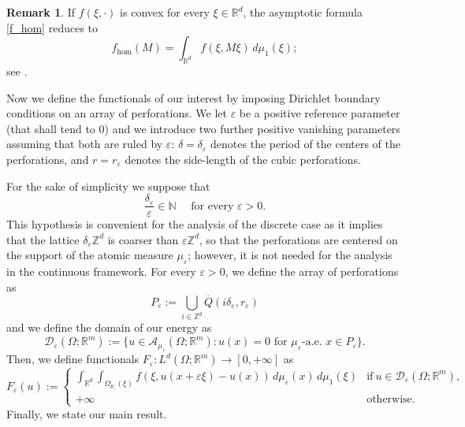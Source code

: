 \documentclass{article}
\theoremstyle{plain}
\theoremstyle{definition}
\newtheorem{remark}[theorem]{Remark}
\def\e{\varepsilon}
\def\rr{{\mathbb R}}
\def\ZZ{{\mathbb Z}}
\newcommand{\A}{\mathcal{A}}
\numberwithin{equation}{section}
\begin{document}
\begin{remark}
If $f(\xi,\cdot)$ is convex for every $\xi \in \mathbb{R}^{d}$, the asymptotic formula \eqref{f_hom} reduces to
 \begin{equation*}
     f_{\hom}(M)=\int_{\mathbb{R}^d}f(\xi,M\xi)\, d\mu_1(\xi);
 \end{equation*}
see \cite[Theorem 6.2]{AABPT}.
\end{remark}

Now we define the functionals of our interest by imposing Dirichlet boundary conditions on an array of perforations. We let $\e$ be a positive reference parameter (that shall tend to $0$) and we introduce two further positive vanishing parameters assuming that both are ruled by $\e$: $\delta=\delta_\e$ denotes the period of the centers of the perforations, and $r=r_\e$ denotes the side-length of the cubic perforations.

For the sake of simplicity we suppose that
\begin{equation*}
\frac{\delta_{\varepsilon}}{\e}\in \mathbb{N}\quad \text{ for every } \e>0.
\end{equation*}
This hypothesis is convenient for the analysis of the discrete case as it implies that the lattice $\delta_\e\ZZ^d$ is coarser than $\e \ZZ^d$, so that the perforations are centered on the support of the atomic measure $\mu_\e$; however, it is not needed for the analysis in the continuous framework. For every $\e>0$, we define the array of perforations as 
\begin{equation*}
    P_{\e}:=\bigcup_{i\in \mathbb{Z}^{d}}\overline{Q}(i\delta_\e,r_{\e})\end{equation*}
and we define the domain of our energy as 
\begin{equation*}
     \mathcal{D}_\e(\Omega;\rr^m):=\{u\in \A_{\mu_\e}(\Omega;\rr^m) : u(x)=0\text{ for } \mu_\e\text{-a.e. } x\in P_\e\}.
\end{equation*}
Then, we define functionals $F_{\varepsilon}:L^d(\Omega;\mathbb{R}^m)\to[0,+\infty]$ as 
\begin{equation}
\label{funzionali}
    F_{\e}(u):=
    \begin{cases}
\displaystyle\int_{\mathbb{R}^{d}}\int_{\Omega_{\mu_\e}(\xi)}f(\xi, u(x+\e\xi)-u(x))\, d\mu_\e(x)\, d\mu_1(\xi) &\text{if}\  u \in  \mathcal{D}_\e(\Omega;\rr^m), \\
        +\infty &\text{otherwise}.
    \end{cases}
\end{equation}
Finally, we state our main result.
\end{document}
